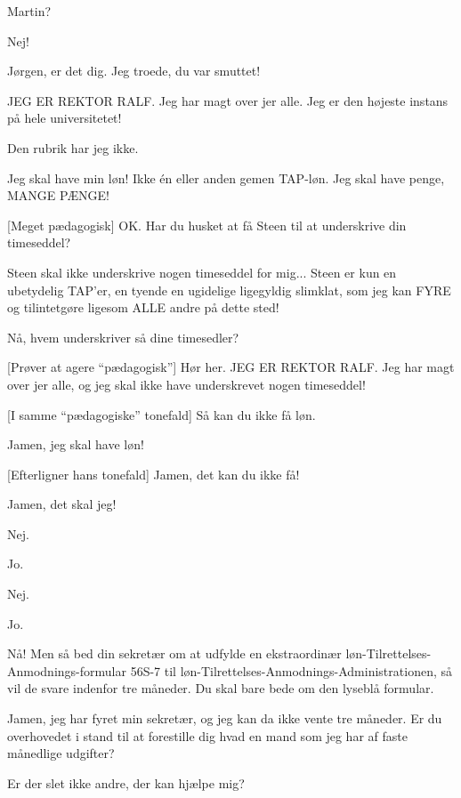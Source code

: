 \documentclass[a4paper,11pt]{article}
\begin{document}
\begin{sketch}
 Martin?

 Nej!

 Jørgen, er det dig. Jeg troede, du var smuttet!

 JEG ER REKTOR RALF. Jeg har magt over jer alle. Jeg er den højeste instans på hele universitetet!

  Den rubrik har jeg 
ikke.

 Jeg skal have min løn! Ikke én eller anden gemen TAP-løn. Jeg skal 
have penge, MANGE PÆNGE!

[Meget pædagogisk] OK. Har du husket at få Steen til at underskrive 
din timeseddel?

 Steen skal ikke underskrive nogen timeseddel for mig... Steen er 
kun en ubetydelig TAP'er, en tyende en ugidelige ligegyldig slimklat, som jeg kan 
 FYRE og tilintetgøre ligesom ALLE andre på dette sted!

 Nå, hvem underskriver så dine timesedler?

[Prøver at agere ``pædagogisk''] Hør her. JEG ER REKTOR RALF. Jeg har 
magt over jer alle, og jeg skal ikke have underskrevet nogen timeseddel!

[I samme ``pædagogiske'' tonefald] Så kan du ikke få løn.

 Jamen, jeg skal have løn!

[Efterligner hans tonefald] Jamen, det kan du ikke få!

 Jamen, det skal jeg!


 Nej.

 Jo.

 Nej.

 Jo.

 Nå! Men så bed din sekretær om at udfylde en ekstraordinær 
løn-Tilrettelses-Anmodnings-formular 56S-7 til 
løn-Tilrettelses-Anmodnings-Administrationen, så vil de svare indenfor tre 
måneder. Du skal bare bede om den lyseblå formular.

 Jamen, jeg har fyret min sekretær, og jeg kan da ikke vente tre 
måneder. Er du overhovedet i stand til at forestille dig hvad en mand som jeg har af faste månedlige udgifter?

 

 Er der slet ikke andre, der kan hjælpe mig?


\end{sketch}
\end{document}
